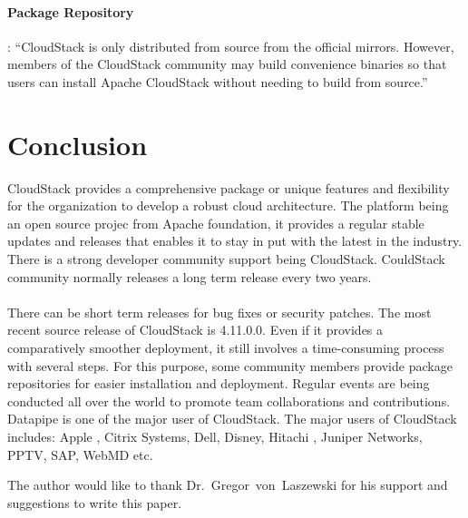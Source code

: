 \paragraph {Package Repository}: ``CloudStack is only distributed from source from the official
mirrors. However, members of the CloudStack community may build convenience binaries 
so that users can install Apache CloudStack without needing to build from source.''
 ~\cite{hid-sp18-417-www-cloudstack-package-repo}

\section{Conclusion}

CloudStack provides a comprehensive package or unique features and flexibility for the 
organization to develop a robust cloud architecture. The platform being an open source projec
from Apache foundation, it provides a regular stable updates and releases that enables it to 
stay in put with the latest in the industry. There is a strong developer community support
being CloudStack. CouldStack community normally releases a long term release every two years.

\paragraph {} There can be short term releases for bug fixes or security patches. The most recent source 
release of CloudStack is 4.11.0.0. Even if it provides a comparatively smoother deployment,
it still involves a time-consuming process with several steps. For this purpose, some community 
members provide package repositories for easier installation and deployment. 
Regular events are being conducted all over the world to promote team collaborations and 
contributions. Datapipe is one of the major user of CloudStack. The major users of CloudStack
includes: Apple , Citrix Systems,  Dell,  Disney, Hitachi , Juniper Networks, PPTV, SAP, 
WebMD etc. 


\begin{acks}

  The author would like to thank Dr.~Gregor~von~Laszewski for his
  support and suggestions to write this paper.

\end{acks}


 
